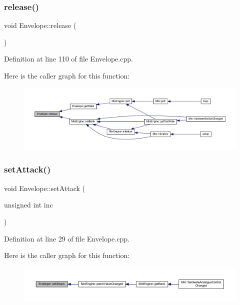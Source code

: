 \subsubsection{\texorpdfstring{release()}{release()}}
{\footnotesize\ttfamily void Envelope\+::release (\begin{DoxyParamCaption}{ }\end{DoxyParamCaption})}



Definition at line 110 of file Envelope.\+cpp.

Here is the caller graph for this function\+:
\nopagebreak
\begin{figure}[H]
\begin{center}
\leavevmode
\includegraphics[width=350pt]{class_envelope_ab21b5747de63336c4a525f3a7e728189_icgraph}
\end{center}
\end{figure}
\mbox{\label{class_envelope_a82398cacd7990d2fdb0606f454610a43}} 
\subsubsection{\texorpdfstring{set\+Attack()}{setAttack()}}
{\footnotesize\ttfamily void Envelope\+::set\+Attack (\begin{DoxyParamCaption}\item[{unsigned int}]{inc }\end{DoxyParamCaption})}



Definition at line 29 of file Envelope.\+cpp.

Here is the caller graph for this function\+:
\nopagebreak
\begin{figure}[H]
\begin{center}
\leavevmode
\includegraphics[width=350pt]{class_envelope_a82398cacd7990d2fdb0606f454610a43_icgraph}
\end{center}
\end{figure}
\mbox{\label{class_envelope_a5ce19b4d570637216cfd8b0c31447d84}} 

